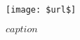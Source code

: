 \begin{figure}
\centering
\texttt{[image: \$url\$]}
\caption{$caption$}
\label{$label$}
\end{figure}

